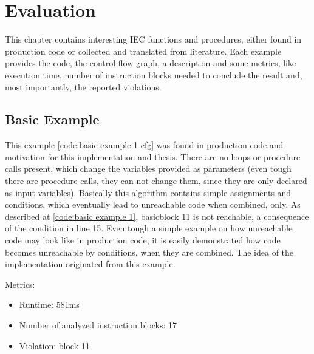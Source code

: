 
\chapter {Evaluation}
\label {cha:evaluation}
This chapter contains interesting IEC functions and procedures, either found in production code or collected and translated from literature.
Each example provides the code, the control flow graph, a description and some metrics, like execution time, number of instruction blocks needed to conclude the result and, most importantly, the reported violations.


\section{Basic Example}
This example \ref{code:basic example 1 cfg} was found in production code and motivation for this implementation and thesis. There are no loops or procedure calls present, which change the variables provided as parameters (even tough there are procedure calls, they can not change them, since they are only declared as input variables).
Basically this algorithm contains simple assignments and conditions, which eventually lead to unreachable code when combined, only.
As described at \ref{code:basic example 1}, basicblock 11 is not reachable, a consequence of the condition in line 15.
Even tough a simple example on how unreachable code may look like in production code, it is easily demonstrated how code becomes unreachable by conditions, when they are combined.
The idea of the implementation originated from this example.



Metrics:
\begin{itemize}
	\item Runtime: 581ms
	\item Number of analyzed instruction blocks: 17
	\item Violation: block 11
\end{itemize}


